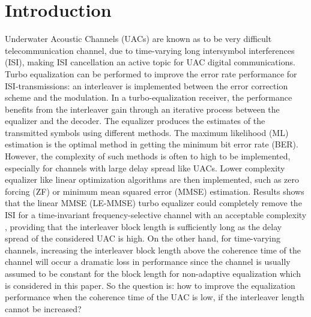 \documentclass[conference]{IEEEtran}
\begin{document}
\section{Introduction}
Underwater Acoustic Channels (UACs) are known as to be very difficult telecommunication channel, due to time-varying long intersymbol interferences (ISI), making ISI cancellation an active topic for UAC digital communications. Turbo equalization\cite{douillard1995iterative} can be performed to improve the error rate performance for ISI-transmissions: an interleaver is implemented between the error correction scheme and the modulation.
In a turbo-equalization receiver, the performance benefits from the interleaver gain through an iterative process between the equalizer and the decoder. The equalizer produces the estimates of the transmitted symbols using different methods. The maximum likelihood (ML) estimation is the optimal method in getting the minimum bit error rate (BER). However, the complexity of such methods is often to high to be implemented, especially for channels with large delay spread like UACs. Lower complexity equalizer like linear optimization algorithms are then implemented, such as zero forcing (ZF) or minimum mean squared error (MMSE) estimation.
Results shows that the linear MMSE (LE-MMSE) turbo equalizer could completely remove the ISI for a time-invariant frequency-selective channel with an acceptable complexity \cite{laot2001turbo,1006557}, providing that the interleaver block length is sufficiently long as the delay spread of the considered UAC is high. On the other hand, for time-varying channels, increasing the interleaver block length above the coherence time  of the channel will occur a dramatic loss in performance since the channel is usually assumed to be constant for the block length for non-adaptive equalization which is considered in this paper. So the question is: how to improve the equalization performance when the coherence time of the UAC is low, if the interleaver length cannot be increased?
\end{document}
